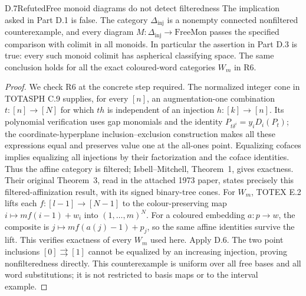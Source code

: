 \begin{claim}{D.7}{Refuted}{Free monoid diagrams do not detect filteredness}
\label{D:not-filtered}
The implication asked in Part D.1 is false. The category
$\Delta_{\mathrm{inj}}$ is a nonempty connected nonfiltered
counterexample, and every diagram
$M:\Delta_{\mathrm{inj}}\to\mathrm{FreeMon}$ passes the specified
comparison with colimit in all monoids. In particular the
assertion in Part D.3 is true: every such monoid colimit has
aspherical classifying space. The same conclusion holds for
all the exact coloured-word categories $W_m$ in R6.
\end{claim}
\begin{proof}
We check R6 at the concrete step required. The normalized
integer cone in TOTASPH C.9 supplies, for every $[n]$, an
augmentation-one combination $t:[n]\to[N]$ for which $th$ is
independent of an injection $h:[k]\to[n]$. Its polynomial
verification uses gap monomials and the identity
$P_{t\delta^i}=y_iD_i(P_t)$; the coordinate-hyperplane
inclusion--exclusion construction makes all these expressions
equal and preserves value one at the all-ones point. Equalizing
cofaces implies equalizing all injections by their factorization
and the coface identities. Thus the affine category is filtered;
Isbell--Mitchell, Theorem~1, gives exactness. Their original
Theorem~3, read in the attached 1973 paper, states precisely this
filtered-affinization result, with its signed binary-tree cones.
For $W_m$, TOTEX E.2 lifts each $f:[l-1]\to[N-1]$ to the
colour-preserving map $i\mapsto mf(i-1)+w_i$ into
$(1,\ldots,m)^N$. For a coloured embedding $a:p\to w$, the
composite is $j\mapsto mf(a(j)-1)+p_j$, so the same affine
identities survive the lift. This verifies exactness of every
$W_m$ used here. Apply D.6. The two
point inclusions $[0]\rightrightarrows[1]$ cannot be equalized
by an increasing injection, proving nonfilteredness directly.
This counterexample is uniform over all free bases and all
word substitutions; it is not restricted to basis maps or to
the interval example.
\end{proof}

